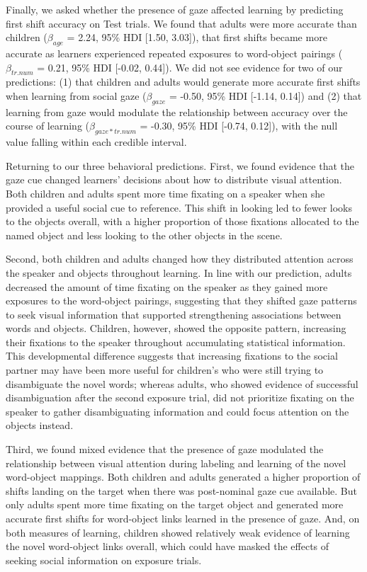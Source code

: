 \documentclass[10pt, letterpaper]{article}
\begin{document}
Finally, we asked whether the presence of gaze affected learning by
predicting first shift accuracy on Test trials. We found that adults
were more accurate than children (\(\beta_{age}\) = 2.24, 95\% HDI
{[}1.50, 3.03{]}), that first shifts became more accurate as learners
experienced repeated exposures to word-object pairings
(\(\beta_{tr.num}\) = 0.21, 95\% HDI {[}-0.02, 0.44{]}). We did not see
evidence for two of our predictions: (1) that children and adults would
generate more accurate first shifts when learning from social gaze
(\(\beta_{gaze}\) = -0.50, 95\% HDI {[}-1.14, 0.14{]}) and (2) that
learning from gaze would modulate the relationship between accuracy over
the course of learning (\(\beta_{gaze*tr.num}\) = -0.30, 95\% HDI
{[}-0.74, 0.12{]}), with the null value falling within each credible
interval.

Returning to our three behavioral predictions. First, we found evidence
that the gaze cue changed learners' decisions about how to distribute
visual attention. Both children and adults spent more time fixating on a
speaker when she provided a useful social cue to reference. This shift
in looking led to fewer looks to the objects overall, with a higher
proportion of those fixations allocated to the named object and less
looking to the other objects in the scene.

Second, both children and adults changed how they distributed attention
across the speaker and objects throughout learning. In line with our
prediction, adults decreased the amount of time fixating on the speaker
as they gained more exposures to the word-object pairings, suggesting
that they shifted gaze patterns to seek visual information that
supported strengthening associations between words and objects.
Children, however, showed the opposite pattern, increasing their
fixations to the speaker throughout accumulating statistical
information. This developmental difference suggests that increasing
fixations to the social partner may have been more useful for children's
who were still trying to disambiguate the novel words; whereas adults,
who showed evidence of successful disambiguation after the second
exposure trial, did not prioritize fixating on the speaker to gather
disambiguating information and could focus attention on the objects
instead.

Third, we found mixed evidence that the presence of gaze modulated the
relationship between visual attention during labeling and learning of
the novel word-object mappings. Both children and adults generated a
higher proportion of shifts landing on the target when there was
post-nominal gaze cue available. But only adults spent more time
fixating on the target object and generated more accurate first shifts
for word-object links learned in the presence of gaze. And, on both
measures of learning, children showed relatively weak evidence of
learning the novel word-object links overall, which could have masked
the effects of seeking social information on exposure trials.
\end{document}
